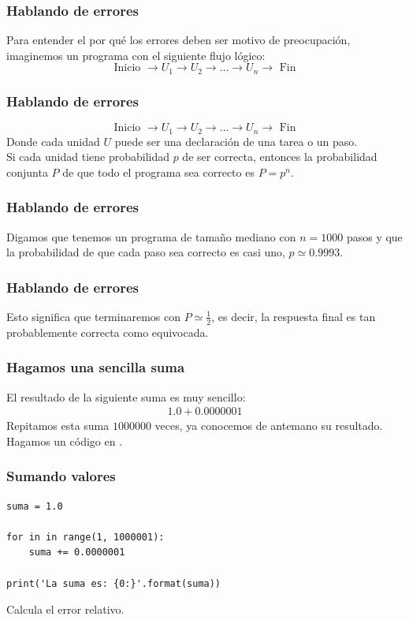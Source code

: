 \documentclass[12pt]{beamer}
\begin{document}
\begin{frame}
\frametitle{Hablando de errores}
Para entender el por qué los errores deben ser motivo de preocupación, imaginemos un programa con el siguiente flujo lógico:
\pause
\begin{equation}
\text{Inicio } \rightarrow U_{1} \rightarrow U_{2} \rightarrow \ldots \rightarrow U_{n} \rightarrow \text{ Fin} 
\label{eq:ecuacion_02_01}
\end{equation}
\end{frame}
\begin{frame}
\frametitle{Hablando de errores}
\begin{equation*}
\text{Inicio } \rightarrow U_{1} \rightarrow U_{2} \rightarrow \ldots \rightarrow U_{n} \rightarrow \text{ Fin} 
\end{equation*}
Donde cada unidad $U$ puede ser una declaración de una tarea o un paso.
\\
\bigskip
\pause
Si cada unidad tiene probabilidad $p$ de ser correcta, entonces la probabilidad conjunta $P$ de que todo el programa sea correcto es $P = p^{n}$.
\\
\end{frame}
\begin{frame}
\frametitle{Hablando de errores}
Digamos que tenemos un programa de tamaño mediano con $n = 1000$ pasos y que la probabilidad de que cada paso sea correcto es casi uno, $p \simeq 0.9993$.
\end{frame}
\begin{frame}
\frametitle{Hablando de errores}
Esto significa que terminaremos con $P \simeq \frac{1}{2}$, es decir, la respuesta final es tan probablemente correcta como equivocada.
\end{frame}
\begin{frame}
\frametitle{Hagamos una sencilla suma}
El resultado de la siguiente suma es muy sencillo:
\pause
\begin{align*}
1.0 + 0.0000001
\end{align*}
\pause
Repitamos esta suma $1000000$ veces, ya conocemos de antemano su resultado. \pause Hagamos un código en \python.
\end{frame}
\begin{frame}[fragile]
\frametitle{Sumando valores}
\begin{lstlisting}[caption=Sumando en un ciclo]
suma = 1.0

for in in range(1, 1000001):
    suma += 0.0000001

print('La suma es: {0:}'.format(suma))
\end{lstlisting}
Calcula el error relativo.
\end{frame}
\end{document}
